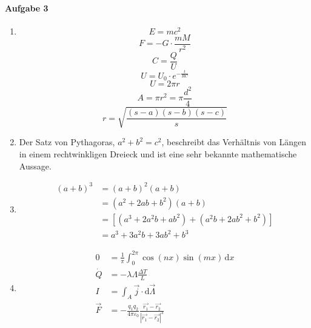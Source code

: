 \documentclass[ngerman, a4paper, 12pt]{scrartcl}
\begin{document}
\paragraph{Aufgabe 3}
\begin{enumerate}
    \item
    \begin{equation}
        E=mc^2
    \end{equation}
    \begin{equation}
        F=-G \cdot \frac{mM}{r^2}
        \label{eq:gravi}
    \end{equation}
    \begin{equation}
        C=\frac{Q}{U}
    \end{equation}
    \begin{equation}
        U=U_0 \cdot e^{-\frac{t}{RC}}
    \end{equation}
    \begin{equation}
        U=2 \pi r
        \label{eq:umf}
    \end{equation}
    \begin{equation}
        A=\pi r^2 = \pi \frac{d^2}{4}
        \label{eq:flach}
    \end{equation}
    \begin{equation}
        r=\sqrt{\frac{(s-a)(s-b)(s-c)}{s}}
    \end{equation}
    \item
    Der Satz von Pythagoras, $a^2+b^2=c^2$, beschreibt das Verhältnis von
    Längen in einem rechtwinkligen Dreieck und ist eine sehr bekannte
    mathematische Aussage.
    \item
    \begin{align}
        (a+b)^3 &= (a+b)^2(a+b) \label{eq:ab1} \\
            &= (a^2+2ab+b^2)(a+b) \\
            &= [(a^3+2a^2b+ab^2)+(a^2b+2ab^2+b^2)] \\
            &= a^3+3a^2b+3ab^2+b^3 \label{eq:ab2}
    \end{align}
    \item
    \begin{align*}
        0 &= \frac{1}{\pi} \int_0^{2\pi} \cos(nx)\sin(mx) \, \mathrm{d}x \\
        \dot{Q} &= -\lambda \Lambda \frac{\Delta T}{L} \\
        I &= \int_A \vec{j} \cdot \mathrm{d}\vec{\Lambda} \\
        \vec{F} &= -\frac{q_1 q_2}{4 \pi
          \varepsilon_0}\frac{\vec{r_1}-\vec{r_2}}{|\vec{r_1}-\vec{r_2}|^3} \\

\end{align*}
\end{enumerate}
\end{document}
